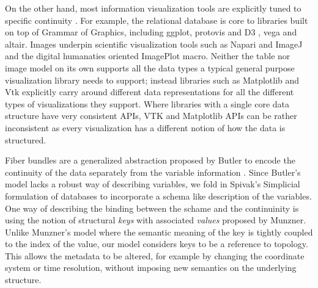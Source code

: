 \documentclass[journal]{vgtc}                %
\begin{document}
On the other hand, most information visualization tools are explicitly tuned to specific continuity \cite{HeerSoftware2006,toryRethinkingVisualizationHighlevel2004}. For example, the relational database is core to libraries built on top of Grammar of Graphics\cite{wilkinsonGrammarGraphics2005}, including ggplot\cite{wickhamGgplot2ElegantGraphics2016a}, protovis\cite{bostockProtoviz2009} and D3 \cite{bostockDataDrivenDocuments2011}, vega\cite{satyanarayanDeclarativeInteractionDesign2014} and altair\cite{vanderplasAltairInteractiveStatistical2018}. Images underpin scientific visualization tools such as Napari\cite{nicholas_sofroniew_2021_4533308} and ImageJ\cite{schneiderNIHImageImageJ2012} and  the digital humanaties oriented ImagePlot\cite{studiesCulturevisImageplot2021} macro. Neither the table nor image model on its own supports all the data types a typical general purpose visualization library needs to support; instead libraries such as Matplotlib\cite{hunterMatplotlib2DGraphics2007} and Vtk\cite{hanwellVisualizationToolkitVTK2015, geveci2012vtk} explicitly carry around different data representations for all the different types of visualizations they support.  Where libraries with a single core data structure have very consistent APIs, VTK and Matplotlib APIs can be rather inconsistent as every visualization has a different notion of how the data is structured.

Fiber bundles are a generalized abstraction proposed by Butler to encode the continuity of the data separately from the variable information \cite{butlerVisualizationModelBased1989,butlerVectorBundleClassesForm1992}. Since Butler's model lacks a robust way of describing variables, we fold in Spivak's Simplicial formulation of databases \cite{spivakDatabasesAreCategories2010,spivakSIMPLICIALDATABASES} to incorporate a schema like description of the variables. One way of describing the binding between the schame and the continuinity is using the notion of structural \textit{keys} with associated \textit{values} proposed by Munzner\cite{munznerVisualizationAnalysisDesign2014}. Unlike Munzner's model where the semantic meaning of the key is tightly coupled to the index of the value, our model considers keys to be a reference to topology. This allows the metadata to be altered, for example by changing the coordinate system or time resolution, without imposing new semantics on the underlying structure. 
\end{document}
